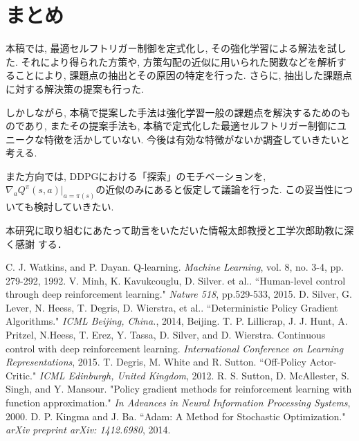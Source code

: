\documentclass[dvipdfmx]{ampmt}
\begin{document}
\section{まとめ}
本稿では, 最適セルフトリガー制御を定式化し, その強化学習による解法を試した. それにより得られた方策や, 方策勾配の近似に用いられた関数などを解析することにより, 課題点の抽出とその原因の特定を行った. さらに, 抽出した課題点に対する解決策の提案も行った. \par
しかしながら, 本稿で提案した手法は強化学習一般の課題点を解決するためのものであり, またその提案手法も, 本稿で定式化した最適セルフトリガー制御にユニークな特徴を活かしていない. 今後は有効な特徴がないか調査していきたいと考える. \par
また方向では, DDPGにおける「探索」のモチベーションを,~$\nabla_{a} Q^{\pi}(s,a)|_{a=\pi(s)}$の近似のみにあると仮定して議論を行った. この妥当性についても検討していきたい.

\acknowledgment
本研究に取り組むにあたって助言をいただいた情報太郎教授と工学次郎助教に深く感謝
する．

\begin{thebibliography}{10}
C. J. Watkins, and P. Dayan. Q-learning. \textit{Machine Learning}, vol. 8, no. 3-4, pp. 279-292, 1992.
V. Minh, K. Kavukcouglu, D. Silver. et al.. “Human-level control through deep reinforcement learning." \textit{Nature 518}, pp.529-533, 2015.
D. Silver, G. Lever, N. Heess, T. Degris, D. Wierstra, et al.. “Deterministic Policy Gradient Algorithms." \textit{ICML Beijing, China.}, 2014, Beijing.
T. P. Lillicrap, J. J. Hunt, A. Pritzel, N.Heess, T. Erez, Y. Tassa, D. Silver, and D. Wierstra. Continuous control with deep reinforcement learning. \textit{International Conference on Learning Representations}, 2015.
T. Degris, M. White and R. Sutton. “Off-Policy Actor-Critic." \textit{ICML Edinburgh, United Kingdom}, 2012.
R. S. Sutton, D. McAllester, S. Singh, and Y. Mansour. "Policy gradient methods for reinforcement learning with function approximation." \textit{In Advances in Neural Information Processing Systems}, 2000.
D. P. Kingma and J. Ba. “Adam: A Method for Stochastic Optimization." \textit{arXiv preprint arXiv: 1412.6980}, 2014.
 
\end{thebibliography}
\end{document}

